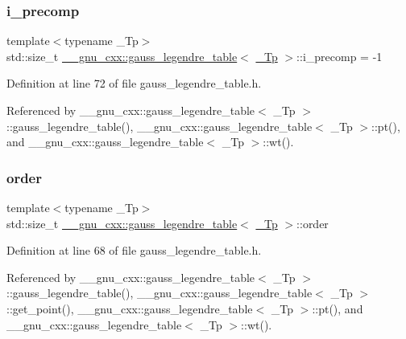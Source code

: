\subsubsection{\texorpdfstring{i\+\_\+precomp}{i\_precomp}}
{\footnotesize\ttfamily template$<$typename \+\_\+\+Tp$>$ \\
std\+::size\+\_\+t \hyperlink{struct____gnu__cxx_1_1gauss__legendre__table}{\+\_\+\+\_\+gnu\+\_\+cxx\+::gauss\+\_\+legendre\+\_\+table}$<$ \hyperlink{namespace____gnu__cxx_a3b19a9c800ca194374ef9172290f7d79}{\+\_\+\+Tp} $>$\+::i\+\_\+precomp = -\/1}



Definition at line 72 of file gauss\+\_\+legendre\+\_\+table.\+h.



Referenced by \+\_\+\+\_\+gnu\+\_\+cxx\+::gauss\+\_\+legendre\+\_\+table$<$ \+\_\+\+Tp $>$\+::gauss\+\_\+legendre\+\_\+table(), \+\_\+\+\_\+gnu\+\_\+cxx\+::gauss\+\_\+legendre\+\_\+table$<$ \+\_\+\+Tp $>$\+::pt(), and \+\_\+\+\_\+gnu\+\_\+cxx\+::gauss\+\_\+legendre\+\_\+table$<$ \+\_\+\+Tp $>$\+::wt().

\mbox{\label{struct____gnu__cxx_1_1gauss__legendre__table_aecdc9cdb90f5a7b4f06a455cd868370f}} 
\subsubsection{\texorpdfstring{order}{order}}
{\footnotesize\ttfamily template$<$typename \+\_\+\+Tp$>$ \\
std\+::size\+\_\+t \hyperlink{struct____gnu__cxx_1_1gauss__legendre__table}{\+\_\+\+\_\+gnu\+\_\+cxx\+::gauss\+\_\+legendre\+\_\+table}$<$ \hyperlink{namespace____gnu__cxx_a3b19a9c800ca194374ef9172290f7d79}{\+\_\+\+Tp} $>$\+::order}



Definition at line 68 of file gauss\+\_\+legendre\+\_\+table.\+h.



Referenced by \+\_\+\+\_\+gnu\+\_\+cxx\+::gauss\+\_\+legendre\+\_\+table$<$ \+\_\+\+Tp $>$\+::gauss\+\_\+legendre\+\_\+table(), \+\_\+\+\_\+gnu\+\_\+cxx\+::gauss\+\_\+legendre\+\_\+table$<$ \+\_\+\+Tp $>$\+::get\+\_\+point(), \+\_\+\+\_\+gnu\+\_\+cxx\+::gauss\+\_\+legendre\+\_\+table$<$ \+\_\+\+Tp $>$\+::pt(), and \+\_\+\+\_\+gnu\+\_\+cxx\+::gauss\+\_\+legendre\+\_\+table$<$ \+\_\+\+Tp $>$\+::wt().

